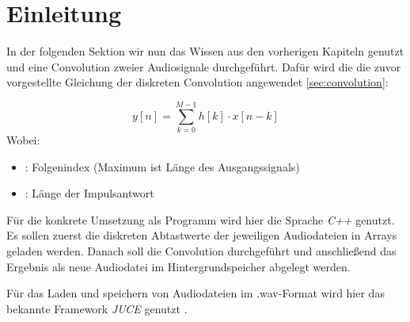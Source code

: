 \section{Einleitung}

In der folgenden Sektion wir nun das Wissen aus den vorherigen Kapiteln genutzt und
eine Convolution zweier Audiosignale durchgeführt.
Dafür wird die die zuvor vorgestellte Gleichung der diskreten Convolution
angewendet \ref{sec:convolution}:

\begin{equation}
    y[n] = \sum_{k=0}^{M-1}h[k] \cdot x[n-k]
    \label{eq:directConv}
\end{equation}
Wobei:
\begin{itemize}
    \item[$n$]: Folgenindex (Maximum ist Länge des Ausgangssignals)
    \item[$M$]: Länge der Impulsantwort
\end{itemize}

Für die konkrete Umsetzung als Programm wird hier die Sprache \textit{C++} genutzt.
Es sollen zuerst die diskreten Abtastwerte der jeweiligen Audiodateien in Arrays
geladen werden. Danach soll die Convolution durchgeführt und anschließend das Ergebnis als neue
Audiodatei im Hintergrundspeicher abgelegt werden.

Für das Laden und speichern von Audiodateien im .wav-Format wird hier das
bekannte Framework \textit{JUCE} genutzt \cite{juce}.
